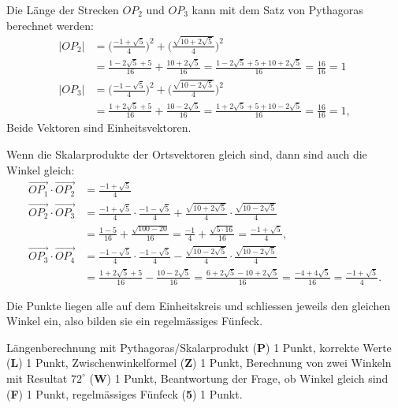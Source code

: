 \begin{loesung}
\begin{teilaufgaben}
\item Die Länge der Strecken $OP_2$ und $OP_3$ kann mit dem Satz von
Pythagoras berechnet werden:
\begin{align*}
|OP_2|&=
\biggl(\frac{-1+\sqrt{5}}4\biggr)^2+ \biggl(\frac{\sqrt{10+2\sqrt{5}}}4 \biggr)^2
\\
&=\frac{1-2\sqrt{5}+5}{16}+\frac{10+2\sqrt{5}}{16}=\frac{1-2\sqrt{5}+5+10+2\sqrt{5}}{16}=\frac{16}{16}=1\\
|OP_3|&=
\biggl(\frac{-1-\sqrt{5}}4\biggr)^2+\biggl( \frac{\sqrt{10-2\sqrt{5}}}4 \biggr)^2
\\
&=\frac{1+2\sqrt{5}+5}{16}+\frac{10-2\sqrt{5}}{16}=\frac{1+2\sqrt{5}+5+10-2\sqrt{5}}{16}=\frac{16}{16}=1,
\end{align*}
Beide Vektoren sind Einheitsvektoren.
\item Wenn die Skalarprodukte der Ortsvektoren gleich sind, dann sind auch
die Winkel gleich:
\begin{align*}
\overrightarrow{OP_1}\cdot\overrightarrow{OP_2}
&=
\frac{-1+\sqrt{5}}4\\
\overrightarrow{OP_2}\cdot\overrightarrow{OP_3}
&=
\frac{-1+\sqrt{5}}4
\cdot
\frac{-1-\sqrt{5}}4
+
\frac{\sqrt{10+2\sqrt{5}}}4
\cdot
\frac{\sqrt{10-2\sqrt{5}}}4
\\
&=
\frac{1-5}{16}+\frac{\sqrt{100-20}}{16}
=\frac{-1}{4}+\frac{\sqrt{5\cdot 16}}{16}
=\frac{-1+\sqrt{5}}{4},
\\
\overrightarrow{OP_3}\cdot\overrightarrow{OP_4}
&=
\frac{-1-\sqrt{5}}4\cdot
\frac{-1-\sqrt{5}}4
-
 \frac{\sqrt{10-2\sqrt{5}}}4
\cdot
\frac{\sqrt{10-2\sqrt{5}}}4
\\
&=\frac{1+2\sqrt{5}+5}{16}-\frac{10-2\sqrt{5}}{16}
=\frac{6+2\sqrt{5}-10+2\sqrt{5}}{16}
=\frac{-4+4\sqrt{5}}{16}=\frac{-1+\sqrt{5}}{4}.
\end{align*}
\item
Die Punkte liegen alle auf dem Einheitskreis und schliessen jeweils
den gleichen Winkel ein, also bilden sie ein regelmässiges Fünfeck.
\qedhere
\end{teilaufgaben}
\end{loesung}

\begin{bewertung}
Längenberechnung mit Pythagoras/Skalarprodukt ({\bf P}) 1 Punkt,
korrekte Werte ({\bf L}) 1 Punkt,
Zwischenwinkelformel ({\bf Z}) 1 Punkt,
Berechnung von zwei Winkeln mit Resultat $72^\circ$ ({\bf W}) 1 Punkt,
Beantwortung der Frage, ob Winkel gleich sind ({\bf F}) 1 Punkt,
regelmässiges Fünfeck ({\bf 5}) 1 Punkt.
\end{bewertung}

